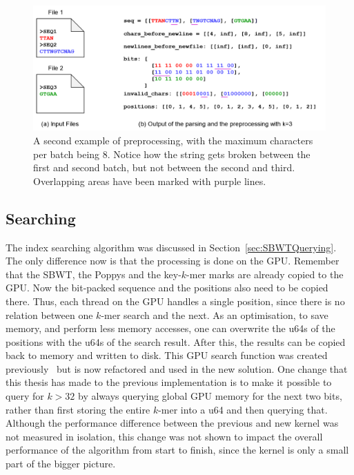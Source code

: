\begin{figure}[t]
  \centering
  \includegraphics[width=\textwidth]{images/Preprocessing2.png}
  \caption{A second example of preprocessing, with the maximum characters per batch being 8. Notice how the string gets broken between the first and second batch, but not between the second and third. Overlapping areas have been marked with purple lines.}\label{fig:Preprocessing2}
\end{figure}

\subsection{Searching}

The index searching algorithm was discussed in Section~\ref{sec:SBWTQuerying}.
The only difference now is that the processing is done on the GPU.
Remember that the SBWT, the Poppys and the key-$k$-mer marks are already copied to the GPU.
Now the bit-packed sequence and the positions also need to be copied there.
Thus, each thread on the GPU handles a single position, since there is no relation between one $k$-mer search and the next.
As an optimisation, to save memory, and perform less memory accesses, one can overwrite the u64s of the positions with the u64s of the search result.
After this, the results can be copied back to memory and written to disk.
This GPU search function was created previously~\cite{Harri} but is now refactored and used in the new solution.
One change that this thesis has made to the previous implementation is to make it possible to query for $k > 32$ by always querying global GPU memory for the next two bits, rather than first storing the entire $k$-mer into a u64 and then querying that.
Although the performance difference between the previous and new kernel was not measured in isolation, this change was not shown to impact the overall performance of the algorithm from start to finish, since the kernel is only a small part of the bigger picture.

